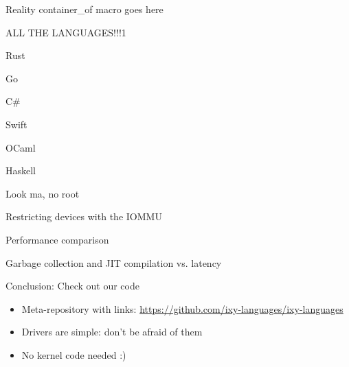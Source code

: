 \documentclass[NET,english,aspectratio=169,notitleframe]{tumbeamer}
\begin{document}
\begin{frame}{Reality}
container\_of macro goes here
\end{frame}

\begin{frame}{ALL THE LANGUAGES!!!1}
\end{frame}


\begin{frame}{Rust}
\end{frame}

\begin{frame}{Go}
\end{frame}

\begin{frame}{C\#}
\end{frame}

\begin{frame}{Swift}
\end{frame}

\begin{frame}{OCaml}
\end{frame}

\begin{frame}{Haskell}
\end{frame}

\begin{frame}{Look ma, no root}
\end{frame}

\begin{frame}{Restricting devices with the IOMMU}
\end{frame}

\begin{frame}{Performance comparison}
\end{frame}

\begin{frame}{Garbage collection and JIT compilation vs. latency}
\end{frame}

\begin{frame}{Conclusion: Check out our code}
\begin{itemize}
\item Meta-repository with links: \url{https://github.com/ixy-languages/ixy-languages}
\item Drivers are simple: don't be afraid of them
\item No kernel code needed :)
\end{itemize}
\end{frame}
\end{document}
